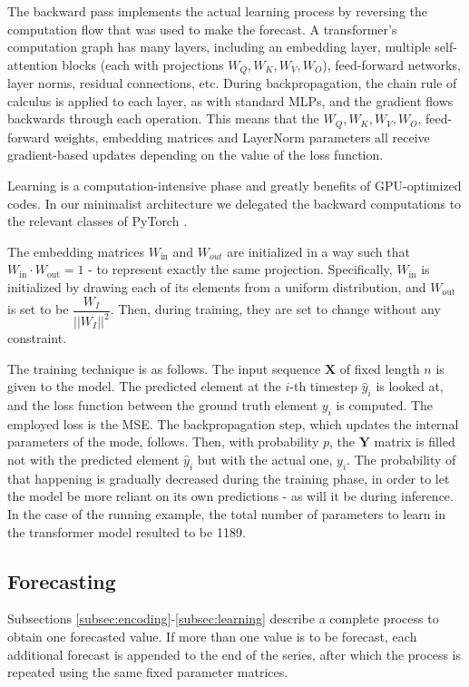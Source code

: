 \documentclass[algorithms,article,submit,pdftex,moreauthors]{Definitions/mdpi}
\begin{document}
The backward pass implements the actual learning process by reversing the computation flow that was used to make the forecast. A transformer's computation graph has many layers, including an embedding layer, multiple self-attention blocks (each with projections $W_Q, W_K, W_V, W_O$), feed-forward networks, layer norms, residual connections, etc. During backpropagation, the chain rule of calculus is applied to each layer, as with standard MLPs, and the gradient flows backwards through each operation. This means that the $W_Q, W_K, W_V, W_O$, feed-forward weights, embedding matrices and LayerNorm parameters all receive gradient-based updates depending on the value of the loss function.

Learning is a computation-intensive phase and greatly benefits of GPU-optimized codes. In our minimalist architecture we delegated the backward computations to the relevant classes of PyTorch \cite{PyTorch25}.

The embedding matrices $W_\text{in}$ and $W_{out}$ are initialized in a way such that $W_\text{in} \cdot W_\text{out} = 1$ - to represent exactly the same projection. Specifically, $W_\text{in}$ is initialized by drawing each of its elements from a uniform distribution, and $W_\text{out}$ is set to be $\dfrac{W_I}{||W_I||^2}$. Then, during training, they are set to change without any constraint.

The training technique is as follows. The input sequence $\textbf{X}$ of fixed length $n$ is given to the model. The predicted element at the $i$-th timestep $\hat y_i$ is looked at, and the loss function between the ground truth element $y_i$ is computed. The employed loss is the MSE. The backpropagation step, which updates the internal parameters of the mode, follows. Then, with probability $p$, the $\textbf{Y}$ matrix is filled not with the predicted element $\hat y_i$ but with the actual one, $y_i$. The probability of that happening is gradually decreased during the training phase, in order to let the model be more reliant on its own predictions - as will it be during inference. In the case of the running example, the total number of parameters to learn in the transformer model resulted to be 1189. 


\subsection{Forecasting} \label{subsec:forecasting}

Subsections \ref{subsec:encoding}-\ref{subsec:learning} describe a complete process to obtain one forecasted value. If more than one value is to be forecast, each additional forecast is appended to the end of the series, after which the process is repeated using the same fixed parameter matrices.
\end{document}
